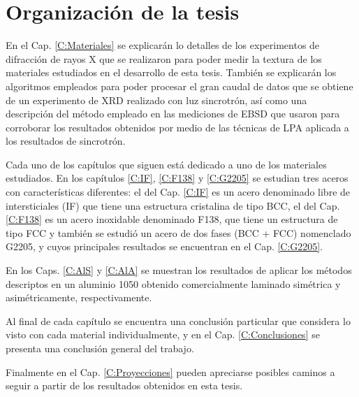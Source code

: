 
\section{Organización de la tesis}\label{S:Org}
En el Cap. \ref{C:Materiales} se explicarán lo detalles de los experimentos de difracción de rayos X que se realizaron para poder medir la textura de los materiales estudiados en el desarrollo de esta tesis. 
También se explicarán los algoritmos empleados para poder procesar el gran caudal de datos que se obtiene de un experimento de XRD realizado con luz sincrotrón, así como una descripción del método empleado en las mediciones de EBSD que usaron para corroborar los resultados obtenidos por medio de las técnicas de LPA aplicada a los resultados de sincrotrón.

Cada uno de los capítulos que siguen está dedicado a uno de los materiales estudiados.
En los capítulos \ref{C:IF}, \ref{C:F138} y \ref{C:G2205} se estudian tres aceros con características diferentes: el del Cap. \ref{C:IF} es un acero denominado libre de intersticiales (IF) que tiene una estructura cristalina de tipo BCC, el del Cap. \ref{C:F138} es un acero inoxidable denominado F138, que tiene un estructura de tipo FCC y también se estudió un acero de dos fases (BCC + FCC) nomenclado G2205, y cuyos principales resultados se encuentran en el Cap. \ref{C:G2205}.

En los Caps. \ref{C:AlS} y \ref{C:AlA} se muestran los resultados de aplicar los métodos descriptos en un aluminio 1050 obtenido comercialmente laminado simétrica y asimétricamente, respectivamente.

Al final de cada capítulo se encuentra una conclusión particular que considera lo visto con cada material individualmente, y en el Cap. \ref{C:Conclusiones} se presenta una conclusión general del trabajo.

Finalmente en el Cap. \ref{C:Proyecciones} pueden apreciarse posibles caminos a seguir a partir de los resultados obtenidos en esta tesis.
